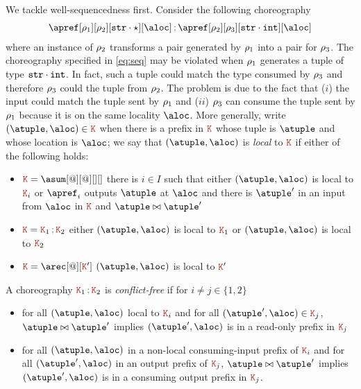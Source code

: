 We tackle well-sequencedness first.
%
Consider the following choreography
\begin{align}\label{eq:seq}
  \apref[\arole_1][\arole_2][{\asort[str] \cdot \wildcard}][\aloc] \seqop
  \apref[\arole_2][\arole_3][{\asort[str] \cdot \asort[int]}][\aloc]
\end{align}
%
where an instance of $\arole_2$ transforms a pair generated by
$\arole_1$ into a pair for $\arole_3$.
%
The choreography specified in \eqref{eq:seq} may be violated when
$\arole_1$ generates a tuple of type $\asort[str] \cdot \asort[int]$.
%
In fact, such a tuple could match the type consumed by $\arole_3$ and
therefore $\arole_3$ could  the tuple from $\arole_2$.
%
The problem is due to the fact that ($i$) the input could match the
tuple sent by $\arole_1$ and ($ii$) $\arole_3$ can consume the tuple
sent by $\arole_1$ because it is on the same locality $\aloc$.
%
More generally, write $(\atuple, \aloc) \in \aK$ when there is a
prefix in $\aK$ whose tuple is $\atuple$ and whose location is
$\aloc$; we say that $(\atuple, \aloc)$ is \emph{local} to $\aK$ if
either of the following holds:
\begin{itemize}
\item $\aK = \asum[@][@][][]$ there is $i \in I$ such that either
  $(\atuple, \aloc)$ is local to $\aK_i$ or $\apref_i$ outputs
  $\atuple$ at $\aloc$ and there is $\atuple'$ in an input from
  $\aloc$ in $\aK$ and $\atuple \matches \atuple'$
\item $\aK = \aK_1 \seqop \aK_2$ either $(\atuple, \aloc)$ is local to
  $\aK_1$ or   $(\atuple, \aloc)$ is local to $\aK_2$
\item $\aK = \arec[@][\aK']$ $(\atuple, \aloc)$ is local to $\aK'$
\end{itemize}
%
A choreography $\aK_1 \seqop \aK_2$ is \emph{conflict-free} if for
$i \neq j \in \{1,2\}$
%
\begin{itemize}
\item for all $(\atuple,\aloc)$ local to $\aK_i$ and for all
  $(\atuple', \aloc) \in \aK_j$, $\atuple \matches \atuple'$ implies
  $(\atuple', \aloc)$ is in a read-only prefix in $\aK_j$
\item for all $(\atuple,\aloc)$ in a non-local consuming-input prefix
  of $\aK_i$ and for all $(\atuple', \aloc)$ in an output prefix of
  $\aK_j$, $\atuple \matches \atuple'$ implies $(\atuple',\aloc)$ is
  in a consuming output prefix in $\aK_j$.
\end{itemize}

